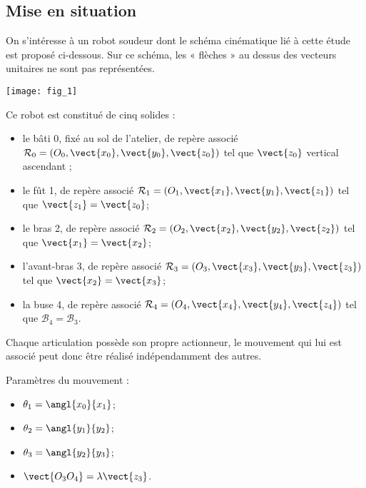 \ifprof
\else
\begin{multicols}{2}
\fi


\subsection*{Mise en situation}

On s’intéresse à un robot soudeur dont le schéma cinématique lié à cette étude est proposé ci-dessous.
Sur ce schéma, les « flèches » au dessus des vecteurs unitaires ne sont pas représentées.


\begin{center}
\texttt{[image: fig\_1]}
\end{center}

Ce robot est constitué de cinq solides :
\begin{itemize}
\item le bâti 0, fixé au sol de l’atelier, de repère associé $\mathcal{R}_0=\left(O_0,\vect{x_0},\vect{y_0},\vect{z_0}\right)$ tel que $\vect{z_0}$ vertical ascendant ;
\item le fût 1, de repère associé $\mathcal{R}_1=\left(O_1,\vect{x_1},\vect{y_1},\vect{z_1}\right)$ tel que $\vect{z_1}  =\vect{z_0}$;
\item le bras 2, de repère associé $\mathcal{R}_2=\left(O_2,\vect{x_2},\vect{y_2},\vect{z_2}\right)$ tel que $\vect{x_1}  =\vect{x_2}$;
\item l’avant-bras 3, de repère associé $\mathcal{R}_3=\left(O_3,\vect{x_3},\vect{y_3},\vect{z_3}\right)$ tel que $\vect{x_2}  =\vect{x_3}$;
\item la buse 4, de repère associé $\mathcal{R}_4=\left(O_4,\vect{x_4},\vect{y_4},\vect{z_4}\right)$ tel que $\mathcal{B}_4  =\mathcal{B}_3$.
\end{itemize}


Chaque articulation possède son propre actionneur, le mouvement qui lui est associé peut donc être réalisé
indépendamment des autres.

\begin{multicols}{2}
\noindent Paramètres du mouvement :
\begin{itemize}
\item $\theta_1 = \angl{x_0}{x_1}$;
\item $\theta_2 = \angl{y_1}{y_2}$;
\item $\theta_3 = \angl{y_2}{y_3}$;
\item $\vect{O_3O_4} = \lambda \vect{z_3}$.
\end{itemize}


\end{multicols}
\end{multicols}
